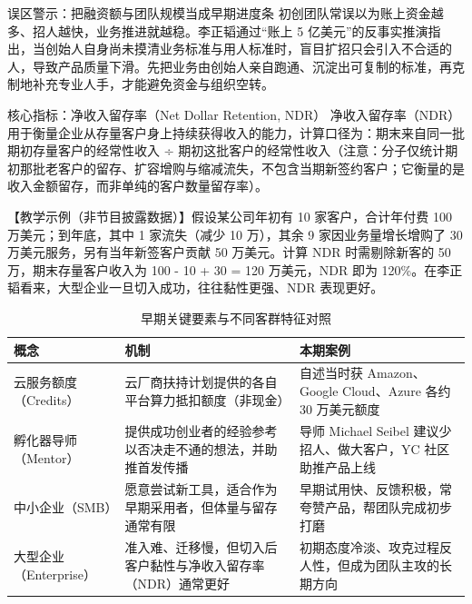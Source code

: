 \documentclass[UTF8,a4paper,11pt,fontset=fandol]{ctexart}
\begin{document}
\begin{warningbox}{误区警示：把融资额与团队规模当成早期进度条}
初创团队常误以为账上资金越多、招人越快，业务推进就越稳。李正韬通过“账上 5 亿美元”的反事实推演指出，当创始人自身尚未摸清业务标准与用人标准时，盲目扩招只会引入不合适的人，导致产品质量下滑。先把业务由创始人亲自跑通、沉淀出可复制的标准，再克制地补充专业人手，才能避免资金与组织空转。
\end{warningbox}
\begin{knowledgebox}{核心指标：净收入留存率（Net Dollar Retention, NDR）}
净收入留存率（NDR）用于衡量企业从存量客户身上持续获得收入的能力，计算口径为：期末来自同一批期初存量客户的经常性收入 ÷ 期初这批客户的经常性收入（注意：分子仅统计期初那批老客户的留存、扩容增购与缩减流失，不包含当期新签约客户；它衡量的是收入金额留存，而非单纯的客户数量留存率）。

【教学示例（非节目披露数据）】假设某公司年初有 10 家客户，合计年付费 100 万美元；到年底，其中 1 家流失（减少 10 万），其余 9 家因业务量增长增购了 30 万美元服务，另有当年新签客户贡献 50 万美元。计算 NDR 时需剔除新客的 50 万，期末存量客户收入为 100 - 10 + 30 = 120 万美元，NDR 即为 120\%。在李正韬看来，大型企业一旦切入成功，往往黏性更强、NDR 表现更好。
\end{knowledgebox}
\begin{table}[H]\centering\small
\caption{早期关键要素与不同客群特征对照}
\begin{tabular}{>{\raggedright\arraybackslash}p{\dimexpr(\linewidth-6\tabcolsep)/3\relax}>{\raggedright\arraybackslash}p{\dimexpr(\linewidth-6\tabcolsep)/3\relax}>{\raggedright\arraybackslash}p{\dimexpr(\linewidth-6\tabcolsep)/3\relax}}
\toprule
概念 & 机制 & 本期案例\\\midrule
云服务额度（Credits） & 云厂商扶持计划提供的各自平台算力抵扣额度（非现金） & 自述当时获 Amazon、Google Cloud、Azure 各约 30 万美元额度\\[4pt]
孵化器导师（Mentor） & 提供成功创业者的经验参考以否决走不通的想法，并助推首发传播 & 导师 Michael Seibel 建议少招人、做大客户，YC 社区助推产品上线\\[4pt]
中小企业（SMB） & 愿意尝试新工具，适合作为早期采用者，但体量与留存通常有限 & 早期试用快、反馈积极，常夸赞产品，帮团队完成初步打磨\\[4pt]
大型企业（Enterprise） & 准入难、迁移慢，但切入后客户黏性与净收入留存率（NDR）通常更好 & 初期态度冷淡、攻克过程反人性，但成为团队主攻的长期方向\\[4pt]
\bottomrule\end{tabular}\end{table}
\end{document}
